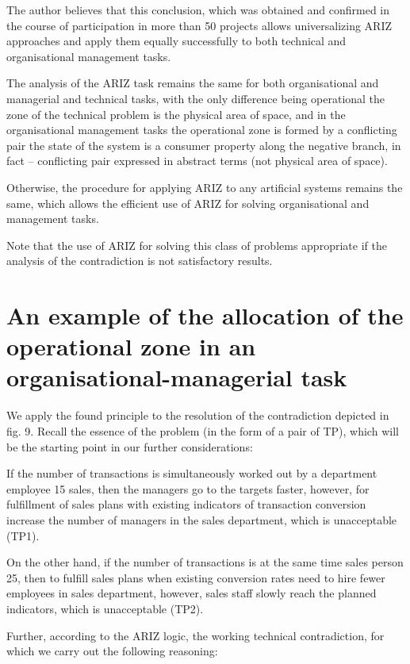 \documentclass[11pt,a4paper]{book}
\begin{document}
The author believes that this conclusion, which was obtained and confirmed in
the course of participation in more than 50 projects allows universalizing
ARIZ approaches and apply them equally successfully to both technical and
organisational management tasks.

The analysis of the ARIZ task remains the same for both organisational and
managerial and technical tasks, with the only difference being operational the
zone of the technical problem is the physical area of space, and in the
organisational management tasks the operational zone is formed by a
conflicting pair the state of the system is a consumer property along the
negative branch, in fact -- conflicting pair expressed in abstract terms (not
physical area of space).

Otherwise, the procedure for applying ARIZ to any artificial systems remains
the same, which allows the efficient use of ARIZ for solving organisational
and management tasks.

Note that the use of ARIZ for solving this class of problems appropriate if
the analysis of the contradiction is not satisfactory results.

\section{An example of the allocation of the operational zone in an
  organisational-managerial task}

We apply the found principle to the resolution of the contradiction depicted
in fig. 9. Recall the essence of the problem (in the form of a pair of TP),
which will be the starting point in our further considerations:

If the number of transactions is simultaneously worked out by a department
employee 15 sales, then the managers go to the targets faster, however, for
fulfillment of sales plans with existing indicators of transaction conversion
increase the number of managers in the sales department, which is unacceptable
(TP1).

On the other hand, if the number of transactions is at the same time sales
person 25, then to fulfill sales plans when existing conversion rates need to
hire fewer employees in sales department, however, sales staff slowly reach
the planned indicators, which is unacceptable (TP2).

Further, according to the ARIZ logic, the working technical contradiction, for
which we carry out the following reasoning:
\end{document}
